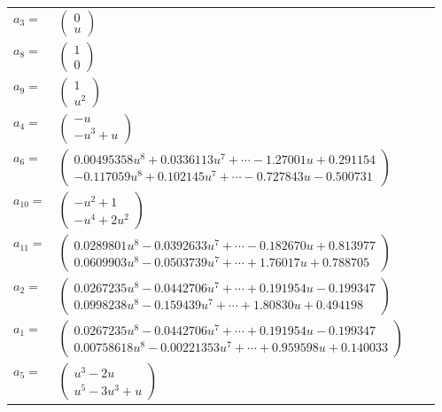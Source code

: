 \documentclass[1p]{elsarticle_modified}
\theoremstyle{definition}
\begin{document}
\begin{tabular}{m{7pt} m{180pt} m{7pt} m{180pt} }
\flushright $a_{3}=$&$\begin{pmatrix}0\\u\end{pmatrix}$ \\
\flushright $a_{8}=$&$\begin{pmatrix}1\\0\end{pmatrix}$ \\
\flushright $a_{9}=$&$\begin{pmatrix}1\\u^2\end{pmatrix}$ \\
\flushright $a_{4}=$&$\begin{pmatrix}- u\\- u^3+u\end{pmatrix}$ \\
\flushright $a_{6}=$&$\begin{pmatrix}0.00495358 u^{8}+0.0336113 u^{7}+\cdots-1.27001 u+0.291154\\-0.117059 u^{8}+0.102145 u^{7}+\cdots-0.727843 u-0.500731\end{pmatrix}$ \\
\flushright $a_{10}=$&$\begin{pmatrix}- u^2+1\\- u^4+2 u^2\end{pmatrix}$ \\
\flushright $a_{11}=$&$\begin{pmatrix}0.0289801 u^{8}-0.0392633 u^{7}+\cdots-0.182670 u+0.813977\\0.0609903 u^{8}-0.0503739 u^{7}+\cdots+1.76017 u+0.788705\end{pmatrix}$ \\
\flushright $a_{2}=$&$\begin{pmatrix}0.0267235 u^{8}-0.0442706 u^{7}+\cdots+0.191954 u-0.199347\\0.0998238 u^{8}-0.159439 u^{7}+\cdots+1.80830 u+0.494198\end{pmatrix}$ \\
\flushright $a_{1}=$&$\begin{pmatrix}0.0267235 u^{8}-0.0442706 u^{7}+\cdots+0.191954 u-0.199347\\0.00758618 u^{8}-0.00221353 u^{7}+\cdots+0.959598 u+0.140033\end{pmatrix}$ \\
\flushright $a_{5}=$&$\begin{pmatrix}u^3-2 u\\u^5-3 u^3+u\end{pmatrix}$ \\

\end{tabular}
\end{document}
